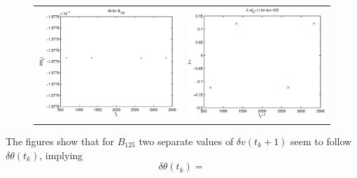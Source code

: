 \documentclass[a4paper,11pt]{article}
\begin{document}
\begin{figure}[ht]
\begin{tabular}{ll}
\includegraphics[scale=0.65]{dthetabin125.eps} & \includegraphics[scale=0.65]{dvbin125.eps}\\
\end{tabular}
\caption{}
\label{fig:dthetadv}
\end{figure}
The figures show that for $B_{125}$ two separate values of $\delta v(t_k+1)$ seem to follow $\delta\theta(t_k)$, implying
$$
\delta\theta(t_k) = 
$$
\end{document}
